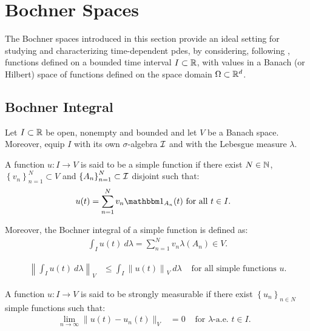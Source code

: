 \section{Bochner Spaces}

The Bochner spaces introduced in this section provide an ideal setting for studying and characterizing time-dependent \acrshort{pdes}, by considering, following \cite[p.~111]{Ern2021}, functions defined on a bounded time interval $I \subset \mathbb{R}$, with values in a Banach (or Hilbert) space of functions defined on the space domain $\Omega \subset \mathbb{R}^{d}$.

\subsection{Bochner Integral}

Let $I \subset \mathbb{R}$ be open, nonempty and bounded and let $V$ be a Banach space. Moreover, equip $I$ with its own $\sigma$-algebra $\mathcal{I}$ and with the Lebesgue measure $\lambda$.

\begin{definition}
    A function $u\colon I \rightarrow V$ is said to be a simple function if there exist $N \in \mathbb{N}$, $\left\{ v_n \right\}_{n = 1}^N \subset V$ and $\left\{ A_n \right\}_{n = 1}^N \subset \mathcal{I}$ disjoint such that:
    \begin{align}
        u(t) = \sum_{n = 1}^N v_n \Characteristic{A_n}(t) &\text{ for all } t \in I.
    \end{align}

    Moreover, the Bochner integral of a simple function is defined as:
    \begin{align}
        \int_I u(t) ~ d \lambda  = \sum_{n = 1}^N v_n \lambda(A_n) \in V.
    \end{align}
\end{definition}

\begin{lemma} %
    \begin{align}
        \left\lVert \int_I u(t) ~ d \lambda \right\rVert_V &\leq \int_I \left\lVert u(t) \right\rVert_V ~ d \lambda &\text{ for all simple functions } u.
    \end{align}
\end{lemma}

\begin{definition}
    A function $u\colon I \rightarrow V$ is said to be strongly measurable if there exist $\left\{ u_n \right\}_{n \in N}$ simple functions such that:
    \begin{align}
        \lim_{n \rightarrow \infty} \lVert u(t) - u_n(t) \rVert_V &= 0 &\text{ for } \lambda \text{-a.e. } t \in I.
&    \end{align}
\end{definition}


